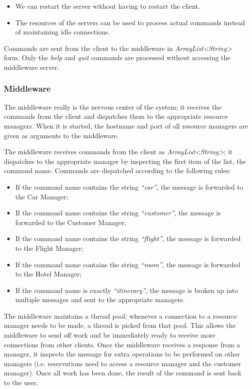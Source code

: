 \documentclass[11pt]{article}
\begin{document}
\begin{itemize}
\item We can restart the server without having to restart the client.
\item The resources of the servers can be used to process actual
  commands instead of maintaining idle connections.
\end{itemize}

Commands are sent from the client to the middleware in
{\it ArrayList<String>} form.  Only the {\it help} and {\it quit}
commands are processed without accessing the middleware server.

\subsubsection{Middleware}

The middleware really is the nervous center of the system; it receives
the commands from the client and dispatches them to the appropriate
resource managers.  When it is started, the hostname and port of all
resource managers are given as arguments to the middleware.

The middleware receives commands from the client as {\it
  ArrayList<String>}; it dispatches to the appropriate manager by
inspecting the first item of the list, the command name.  Commands are
dispatched according to the following rules:


\begin{itemize}
\item If the command name contains the string {\it ``car''}, the
  message is forwarded to the Car Manager;
\item If the command name contains the string {\it ``customer''}, the
  message is forwarded to the Customer Manager;
\item If the command name contains the string {\it ``flight''}, the
  message is forwarded to the Flight Manager;
\item If the command name contains the string {\it ``room''}, the
  message is forwarded to the Hotel Manager;
\item If the command name is exactly {\it ``itinerary''}, the message
  is broken up into multiple messages and sent to the appropriate
  managers.
\end{itemize}

The middleware maintains a thread pool; whenever a connection to a
resource manager needs to be made, a thread is picked from that pool.
This allows the middleware to send off work and be immediately ready
to receive more connections from other clients.  Once the middleware
receives a response from a manager, it inspects the message for extra
operations to be performed on other managers (i.e. reservations need
to access a resource manager and the customer manager).  Once all work
has been done, the result of the command is sent back to the user.
\end{document}
